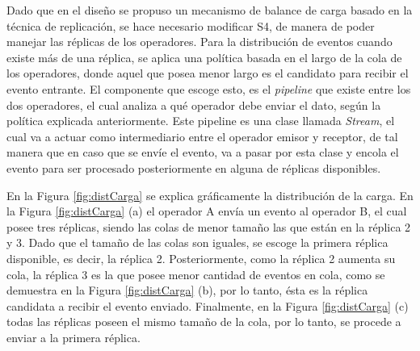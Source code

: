 Dado que en el dise\~no se propuso un mecanismo de balance de carga basado en la t\'ecnica de replicaci\'on, se hace necesario modificar S4, de manera de poder manejar las r\'eplicas de los operadores. Para la distribuci\'on de eventos cuando existe m\'as de una r\'eplica, se aplica una pol\'itica basada en el largo de la cola de los operadores, donde aquel que posea menor largo es el candidato para recibir el evento entrante. \normalsize{El componente que escoge esto, es el \textit{pipeline} que existe entre los dos operadores, el cual analiza a qu\'e operador debe enviar el dato, seg\'un la pol\'itica explicada anteriormente. Este pipeline es una clase llamada \textit{Stream}, el cual va a actuar como intermediario entre el operador emisor y receptor, de tal manera que en caso que se env\'ie el evento, va a pasar por esta clase y encola el evento para ser procesado posteriormente en alguna de r\'eplicas disponibles.}

En la Figura \ref{fig:distCarga} se explica gr\'aficamente la distribuci\'on de la carga. En la Figura \ref{fig:distCarga} (a) el operador A env\'ia un evento al operador B, el cual posee tres r\'eplicas, siendo \normalsize{las colas de menor tama\~no} las que est\'an en la r\'eplica 2 y 3. Dado que el tama\~no de las colas son iguales, se escoge la primera r\'eplica disponible, es decir, la r\'eplica 2. Posteriormente, como la r\'eplica 2 aumenta su cola, la r\'eplica 3 es la que posee menor cantidad de eventos en cola, como se demuestra en la Figura \ref{fig:distCarga} (b), por lo tanto, \'esta es la r\'eplica candidata a recibir el evento enviado. Finalmente, en la Figura \ref{fig:distCarga} (c) todas las r\'eplicas poseen el mismo tama\~no de la cola, por lo tanto, se procede a enviar a la primera r\'eplica.

